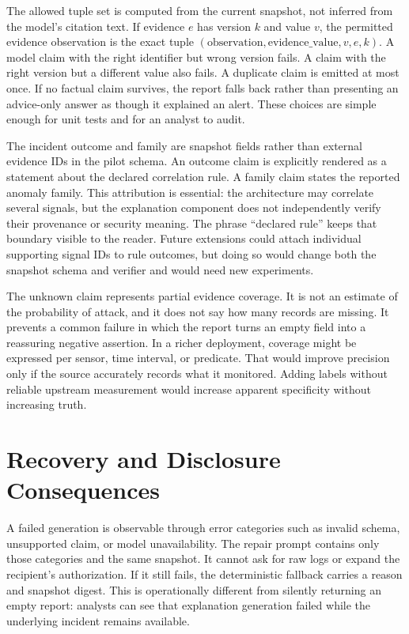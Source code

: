 The allowed tuple set is computed from the current snapshot, not inferred from the model's citation text. If evidence $e$ has version $k$ and value $v$, the permitted evidence observation is the exact tuple $(\mathrm{observation},\mathrm{evidence\_value},v,e,k)$. A model claim with the right identifier but wrong version fails. A claim with the right version but a different value also fails. A duplicate claim is emitted at most once. If no factual claim survives, the report falls back rather than presenting an advice-only answer as though it explained an alert. These choices are simple enough for unit tests and for an analyst to audit.

The incident outcome and family are snapshot fields rather than external evidence IDs in the pilot schema. An outcome claim is explicitly rendered as a statement about the declared correlation rule. A family claim states the reported anomaly family. This attribution is essential: the architecture may correlate several signals, but the explanation component does not independently verify their provenance or security meaning. The phrase ``declared rule'' keeps that boundary visible to the reader. Future extensions could attach individual supporting signal IDs to rule outcomes, but doing so would change both the snapshot schema and verifier and would need new experiments.

The unknown claim represents partial evidence coverage. It is not an estimate of the probability of attack, and it does not say how many records are missing. It prevents a common failure in which the report turns an empty field into a reassuring negative assertion. In a richer deployment, coverage might be expressed per sensor, time interval, or predicate. That would improve precision only if the source accurately records what it monitored. Adding labels without reliable upstream measurement would increase apparent specificity without increasing truth.

\section{Recovery and Disclosure Consequences}
A failed generation is observable through error categories such as invalid schema, unsupported claim, or model unavailability. The repair prompt contains only those categories and the same snapshot. It cannot ask for raw logs or expand the recipient's authorization. If it still fails, the deterministic fallback carries a reason and snapshot digest. This is operationally different from silently returning an empty report: analysts can see that explanation generation failed while the underlying incident remains available.

